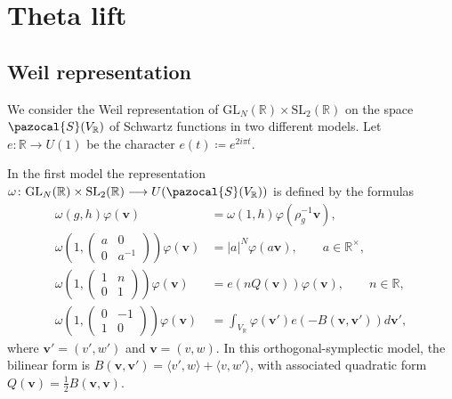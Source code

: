 \documentclass[a4paper,11pt]{amsart} %
\newcommand{\8}{\infty}
\newcommand{\vbf}{\mathbf{v}}
\newcommand{\SL}{\mathrm{SL}}
\newcommand{\GL}{\mathrm{GL}}
\newcommand{\R}{\mathbb{R}}
\newcommand{\Scal}{\pazocal{S}}
\theoremstyle{mytheoremstyle}
\theoremstyle{remark}
\numberwithin{equation}{section}
\begin{document}

\section{Theta lift}


\subsection{Weil representation} \label{weil theta}
We consider the Weil representation of $\GL_N(\R) \times \SL_2(\R)$ on the space $\Scal(V_\R)$ of Schwartz functions in two different models. Let $e \colon \R \longrightarrow U(1)$ be the character $e(t)\coloneqq e^{2i\pi t}$.

In the first model the representation $\omega \colon \GL_N(\R) \times \SL_2(\R) \longrightarrow U(\Scal(V_\R))$ is defined by the formulas
\begin{align*}
\omega\left (g, h \right ) \varphi(\vbf)&=\omega(1,h)\varphi(\rho_g^{-1}\vbf), \\
    \omega\left (1, \begin{pmatrix}
        a & 0 \\ 0 & a^{-1}
    \end{pmatrix} \right ) \varphi(\vbf)&=\vert a \vert^N \varphi(a\vbf), \qquad a \in \R^\times, \\
    \omega\left (1, \begin{pmatrix}
        1 & n \\ 0 & 1
    \end{pmatrix} \right ) \varphi(\vbf)&=e \left ( nQ(\vbf) \right ) \varphi(\vbf), \qquad n \in \R, \\
    \omega\left (1, \begin{pmatrix}
        0 & -1 \\ 1 & 0
    \end{pmatrix} \right ) \varphi(\vbf)&= \int_{V_\R} \varphi(\vbf') e \left (- B(\vbf,\vbf') \right )d\vbf',
\end{align*}
where $\vbf'=(v',w')$ and $\vbf=(v,w)$. In this orthogonal-symplectic model, the bilinear form is $B(\vbf,\vbf')=\langle v',w \rangle+ \langle v,w' \rangle$, with associated quadratic form $Q(\vbf)=\frac{1}{2}B(\vbf,\vbf)$.   
\end{document}
